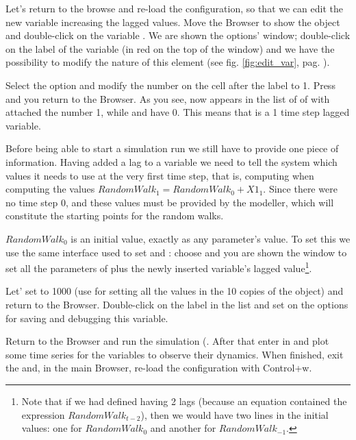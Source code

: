 \documentclass [11pt,a4paper] {book}
\begin{document}
Let's return to the browse and re-load the configuration, so that we can edit the new variable increasing the lagged values.
Move the Browser to show the object  and double-click on the variable . We are shown the options'
window; double-click on the label of the variable (in red on the top of the window) and
we have the possibility to modify the nature of this element (see fig.
\ref{fig:edit_var}, pag. \pageref{fig:edit_var}).

Select the option  and modify the number on the cell after the label  to 1.
Press  and you return to the Browser. As you see, now  appears
in the list of  of  with attached the number 1, while 
and  have 0. This means that  is a 1 time step lagged variable.

Before being able to start a simulation run we still have to provide one piece of information. Having added a lag to a variable we need to tell the system which values it needs to use at the very first time step, that is, computing when computing the values $RandomWalk_1=RandomWalk_0+X1_1$. Since there were no time step 0, and these values must be
provided by the modeller, which will constitute the starting points for the random walks. 

$RandomWalk_0$ is an initial value, exactly as any parameter's value. To set this we use
the same interface used to set  and : choose  and you are shown the window to set all the parameters of  plus the
newly inserted variable's lagged value\footnote{Note that if we had defined
 having 2 lags (because an equation contained the expression
$RandomWalk_{t-2}$), then we would have two lines in the initial values: one for
$RandomWalk_0$ and another for $RandomWalk_{-1}$.}.

Let' set  to 1000 (use  for setting all the values in
the 10 copies of the object) and return to the Browser. Double-click on the
 label in the  list and set on the options for saving
and debugging this variable.

Return to the Browser and run the simulation (. After that enter in
 and plot some time series for the  variables
to observe their dynamics. When finished, exit the  and, in the
main Browser, re-load the configuration with Control+w.
\end{document}
